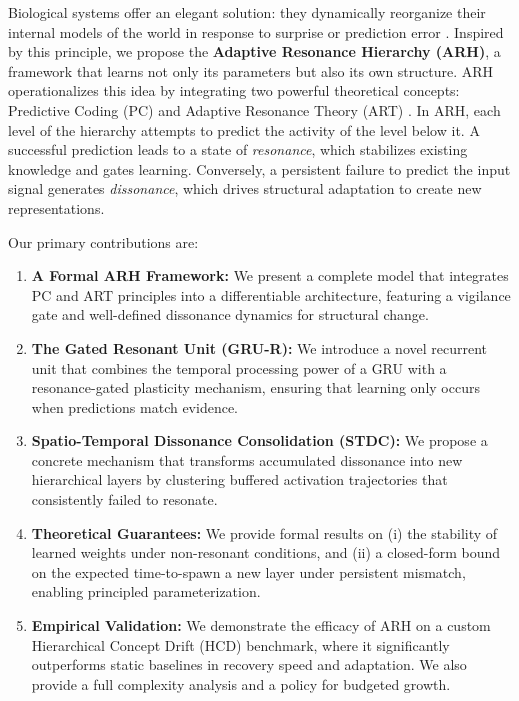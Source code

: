 \documentclass{article}
\begin{document}
Biological systems offer an elegant solution: they dynamically reorganize their internal models of the world in response to surprise or prediction error \citep{Piaget1954}. Inspired by this principle, we propose the \textbf{Adaptive Resonance Hierarchy (ARH)}, a framework that learns not only its parameters but also its own structure. ARH operationalizes this idea by integrating two powerful theoretical concepts: Predictive Coding (PC) \citep{Rao1999} and Adaptive Resonance Theory (ART) \citep{Grossberg1987}. In ARH, each level of the hierarchy attempts to predict the activity of the level below it. A successful prediction leads to a state of \emph{resonance}, which stabilizes existing knowledge and gates learning. Conversely, a persistent failure to predict the input signal generates \emph{dissonance}, which drives structural adaptation to create new representations.

Our primary contributions are:
\begin{enumerate}
    \item \textbf{A Formal ARH Framework:} We present a complete model that integrates PC and ART principles into a differentiable architecture, featuring a vigilance gate and well-defined dissonance dynamics for structural change.
    \item \textbf{The Gated Resonant Unit (GRU-R):} We introduce a novel recurrent unit that combines the temporal processing power of a GRU with a resonance-gated plasticity mechanism, ensuring that learning only occurs when predictions match evidence.
    \item \textbf{Spatio-Temporal Dissonance Consolidation (STDC):} We propose a concrete mechanism that transforms accumulated dissonance into new hierarchical layers by clustering buffered activation trajectories that consistently failed to resonate.
    \item \textbf{Theoretical Guarantees:} We provide formal results on (i) the stability of learned weights under non-resonant conditions, and (ii) a closed-form bound on the expected time-to-spawn a new layer under persistent mismatch, enabling principled parameterization.
    \item \textbf{Empirical Validation:} We demonstrate the efficacy of ARH on a custom Hierarchical Concept Drift (HCD) benchmark, where it significantly outperforms static baselines in recovery speed and adaptation. We also provide a full complexity analysis and a policy for budgeted growth.
\end{enumerate}
\end{document}
